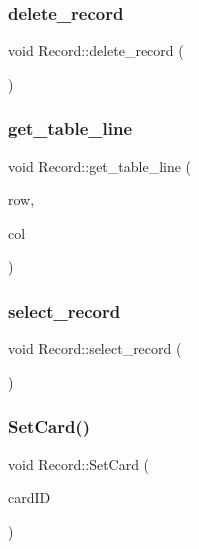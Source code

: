 \subsubsection{\texorpdfstring{delete\_record}{delete\_record}}
{\footnotesize\ttfamily void Record\+::delete\+\_\+record (\begin{DoxyParamCaption}{ }\end{DoxyParamCaption})\hspace{0.3cm}{\ttfamily [slot]}}

\mbox{\label{class_record_a89ae432465b31de8a27e2fe8e929b62a}} 
\subsubsection{\texorpdfstring{get\_table\_line}{get\_table\_line}}
{\footnotesize\ttfamily void Record\+::get\+\_\+table\+\_\+line (\begin{DoxyParamCaption}\item[{int}]{row,  }\item[{int}]{col }\end{DoxyParamCaption})\hspace{0.3cm}{\ttfamily [slot]}}

\mbox{\label{class_record_a5fdd1f2b39a2de50ec73b57bb24bb8dc}} 
\subsubsection{\texorpdfstring{select\_record}{select\_record}}
{\footnotesize\ttfamily void Record\+::select\+\_\+record (\begin{DoxyParamCaption}{ }\end{DoxyParamCaption})\hspace{0.3cm}{\ttfamily [slot]}}

\mbox{\label{class_record_ac08eeade2dbe9fd49ba7d508865f2ab1}} 
\subsubsection{\texorpdfstring{SetCard()}{SetCard()}}
{\footnotesize\ttfamily void Record\+::\+Set\+Card (\begin{DoxyParamCaption}\item[{Q\+String}]{card\+ID }\end{DoxyParamCaption})}

